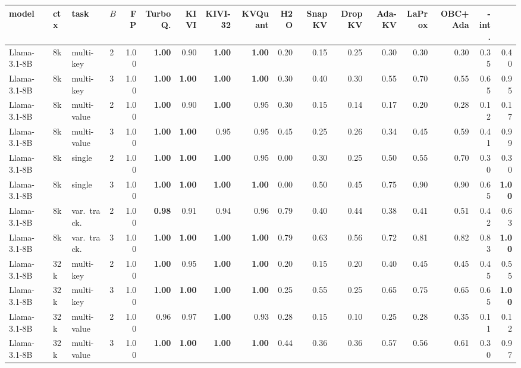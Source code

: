 \begin{tabular}{@{}llllrrrrrrrrrrrrr@{}}
\toprule
model & ctx & task & $B$ & FP & TurboQ. & KIVI & KIVI-32 & KVQuant & H2O & SnapKV & DropKV & Ada-KV & LaProx & OBC+Ada & \sieve{}-int. & \sieve{} \\
\midrule
Llama-3.1-8B & 8k & multi-key & 2 & 1.00 & \textbf{1.00} & 0.90 & \textbf{1.00} & \textbf{1.00} & 0.20 & 0.15 & 0.25 & 0.30 & 0.30 & 0.30 & 0.35 & 0.40 \\
Llama-3.1-8B & 8k & multi-key & 3 & 1.00 & \textbf{1.00} & \textbf{1.00} & \textbf{1.00} & \textbf{1.00} & 0.30 & 0.40 & 0.30 & 0.55 & 0.70 & 0.55 & 0.65 & 0.95 \\
Llama-3.1-8B & 8k & multi-value & 2 & 1.00 & \textbf{1.00} & 0.90 & \textbf{1.00} & 0.95 & 0.30 & 0.15 & 0.14 & 0.17 & 0.20 & 0.28 & 0.12 & 0.17 \\
Llama-3.1-8B & 8k & multi-value & 3 & 1.00 & \textbf{1.00} & \textbf{1.00} & 0.95 & 0.95 & 0.45 & 0.25 & 0.26 & 0.34 & 0.45 & 0.59 & 0.41 & 0.99 \\
Llama-3.1-8B & 8k & single & 2 & 1.00 & \textbf{1.00} & \textbf{1.00} & \textbf{1.00} & 0.95 & 0.00 & 0.30 & 0.25 & 0.50 & 0.55 & 0.70 & 0.30 & 0.30 \\
Llama-3.1-8B & 8k & single & 3 & 1.00 & \textbf{1.00} & \textbf{1.00} & \textbf{1.00} & \textbf{1.00} & 0.00 & 0.50 & 0.45 & 0.75 & 0.90 & 0.90 & 0.65 & \textbf{1.00} \\
Llama-3.1-8B & 8k & var.\ track. & 2 & 1.00 & \textbf{0.98} & 0.91 & 0.94 & 0.96 & 0.79 & 0.40 & 0.44 & 0.38 & 0.41 & 0.51 & 0.42 & 0.63 \\
Llama-3.1-8B & 8k & var.\ track. & 3 & 1.00 & \textbf{1.00} & \textbf{1.00} & \textbf{1.00} & \textbf{1.00} & 0.79 & 0.63 & 0.56 & 0.72 & 0.81 & 0.82 & 0.83 & \textbf{1.00} \\
\addlinespace[1pt]
Llama-3.1-8B & 32k & multi-key & 2 & 1.00 & \textbf{1.00} & 0.95 & \textbf{1.00} & \textbf{1.00} & 0.20 & 0.15 & 0.20 & 0.40 & 0.45 & 0.45 & 0.45 & 0.55 \\
Llama-3.1-8B & 32k & multi-key & 3 & 1.00 & \textbf{1.00} & \textbf{1.00} & \textbf{1.00} & \textbf{1.00} & 0.25 & 0.55 & 0.25 & 0.65 & 0.75 & 0.65 & 0.65 & \textbf{1.00} \\
Llama-3.1-8B & 32k & multi-value & 2 & 1.00 & 0.96 & 0.97 & \textbf{1.00} & 0.93 & 0.28 & 0.15 & 0.10 & 0.25 & 0.28 & 0.35 & 0.11 & 0.12 \\
Llama-3.1-8B & 32k & multi-value & 3 & 1.00 & \textbf{1.00} & \textbf{1.00} & \textbf{1.00} & \textbf{1.00} & 0.44 & 0.36 & 0.36 & 0.57 & 0.56 & 0.61 & 0.30 & 0.97 \\

\end{tabular}

